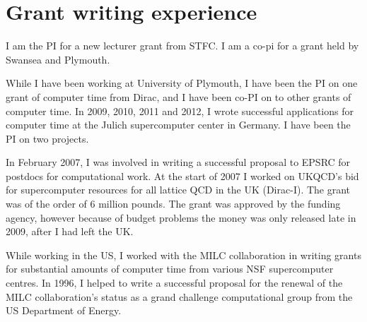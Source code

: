 
\section{Grant writing experience} 

I am the PI for  a new lecturer grant from STFC. I am
a co-pi for a grant held by Swansea and Plymouth.

While I have been working  at University of Plymouth, I have been
the PI on one grant of computer time from Dirac, and I have been
co-PI on to other grants of computer time.
In 2009, 2010, 2011
and 2012,
I wrote successful applications for computer time at the Julich
supercomputer center in Germany. I have been the PI on two projects.

In February 2007, I was involved in writing a successful proposal to
EPSRC for postdocs for computational work.  At the start of 2007 I
worked on UKQCD's bid for supercomputer resources for all lattice QCD
in the UK (Dirac-I). The grant was of the order of 6 million
pounds. The grant was approved by the funding agency, however because
of budget problems the money was only released late in 2009, after I
had left the UK.


While working in the US,
I worked with the MILC collaboration in writing grants for
substantial amounts of computer time from various NSF supercomputer
centres. In 1996, I helped to write a successful proposal for the
renewal of the MILC collaboration's status as a grand challenge
computational group from the US Department of Energy. 

